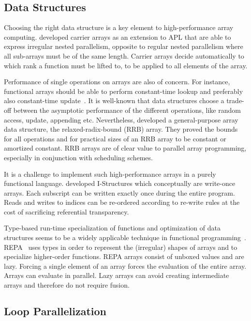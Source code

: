 \documentclass[a4paper]{article}
\begin{document}
\subsection{Data Structures}
\label{sec:data-structures}

Choosing the right data structure is a key element to high-performance
array computing. \citet{Lowney:1981:CAI:567532.567533} developed
carrier arrays as an extension to APL that are able to express
irregular nested parallelism, opposite to regular nested parallelism
where all sub-arrays must be of the same length. Carrier arrays decide
automatically to which rank a function must be lifted to, to be
applied to all elements of the array.

Performance of single operations on arrays are also of concern. For
instance, functional arrays should be able to perform constant-time
lookup and preferably also constant-time update~\cite{47507}. It is
well-known that data structures choose a trade-off between the
asymptotic performance of the different operations, like random
access, update, appending etc. Nevertheless,
\citet{Stucki:2015:RVP:2784731.2784739} developed a general-purpose
array data structure, the relaxed-radix-bound (RRB) array. They proved
the bounds for all operations and for practical sizes of an RRB array
to be constant or amortized constant. RRB arrays are of clear value to
parallel array programming, especially in conjunction with scheduling
schemes.

It is a challenge to implement such high-performance arrays in a
purely functional language. \citet{Arvind:1989:IDS:69558.69562}
developed I-Structures which conceptually are write-once arrays. Each
subscript can be written exactly once during the entire program. Reads
and writes to indices can be re-ordered according to re-write rules at
the cost of sacrificing referential transparency.

Type-based run-time specialization of functions and optimization of
data structures seems to be a widely applicable technique in
functional
programming~\cite{Hall:1994:UHT:182409.156781}. REPA~\cite{Keller:2010:RSP:1863543.1863582}
uses types in order to represent the (irregular) shapes of arrays and
to specialize higher-order functions. REPA arrays consist of unboxed
values and are lazy. Forcing a single element of an array forces the
evaluation of the entire array. Arrays can evaluate in parallel. Lazy
arrays can avoid creating intermediate arrays and therefore do not
require fusion.

\subsection{Loop Parallelization}
\label{sec:loop-parallelization}
\end{document}
